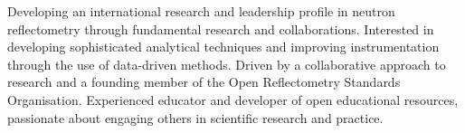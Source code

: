 \vspace{0.25cm}

\begin{cvparagraph}

Developing an international research and leadership profile in neutron reflectometry through fundamental research and collaborations. 
Interested in developing sophisticated analytical techniques and improving instrumentation through the use of data-driven methods.
Driven by a collaborative approach to research and a founding member of the Open Reflectometry Standards Organisation.
Experienced educator and developer of open educational resources, passionate about engaging others in scientific research and practice. 
\end{cvparagraph}